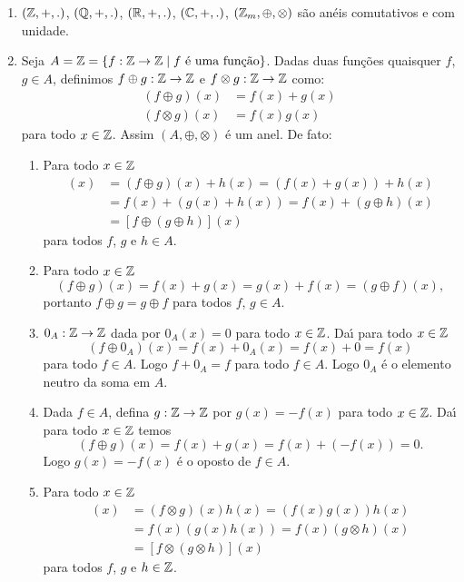 \begin{exemplos}
	\begin{enumerate}[label={\arabic*})]
		\item $(\mathbb{Z},+,.)$, $(\mathbb{Q},+,.)$, $(\mathbb{R},+,.)$, $(\mathbb{C},+,.)$, $(\mathbb{Z}_m, \oplus, \otimes)$ s{\~a}o an{\'e}is comutativos e com unidade.

		\item  Seja $A = \z =\{f : \z \to \z \mid f \mbox{ {\'e} uma fun{\c c}{\~a}o}\}$. Dadas duas fun{\c c}{\~o}es quaisquer $f$, $g \in A$, definimos $f\oplus g:\mathbb{Z} \to \mathbb{Z}$ e $f \otimes g:\mathbb{Z} \to \mathbb{Z}$ como:
		\begin{align*}
			(f\oplus g)(x) &= f(x) + g(x)\\
			(f\otimes g)(x) &= f(x)g(x)
		\end{align*}
		para todo $x \in \mathbb{Z}$. Assim $(A, \oplus, \otimes)$ \'e um anel. De fato:
		\begin{enumerate}[label={\roman*})]
			\item Para todo $x \in \mathbb{Z}$
			\begin{align*}
				[(f \oplus g) \oplus h](x) &= (f \oplus g)(x) + h(x) = (f(x) + g(x)) + h(x)\\
				&= f(x) + (g(x) + h(x)) = f(x) + (g \oplus h)(x)\\ &= [f \oplus (g \oplus h)](x)
			\end{align*}
			para todos $f$, $g$ e $h \in A$.

			\item Para todo $x \in \mathbb{Z}$
			\[
				(f\oplus g)(x) = f(x) + g(x) = g(x) + f(x) = (g\oplus f)(x),
			\]
			portanto $f\oplus g = g\oplus f$ para todos $f$, $g \in A$.

			\item $0_A : \mathbb{Z} \to \mathbb{Z}$ dada por $0_A(x) = 0$ para todo $x \in \mathbb{Z}$. Da{\'\i} para todo $x \in \mathbb{Z}$
			\[
				(f \oplus 0_A)(x) = f(x) + 0_A(x) = f(x) + 0 = f(x)
			\]
			para todo $f \in A$. Logo $f + 0_A = f$ para todo $f \in A$. Logo $0_A$ \'e o elemento neutro da soma em $A$.

			\item Dada $f \in A$, defina $g : \mathbb{Z} \to \mathbb{Z}$ por $g(x) = -f(x)$ para todo $x \in \mathbb{Z}$. Da{\'\i} para todo $x \in \mathbb{Z}$ temos
			\[
				(f \oplus g)(x) = f(x) + g(x) = f(x) + (-f(x)) = 0.
			\]
			Logo $g(x) = -f(x)$ \'e o oposto de $f \in A$.

			\item Para todo $x \in \mathbb{Z}$
			\begin{align*}
				[(f \otimes g)\otimes h](x) &= (f \otimes g)(x)h(x) = (f(x)g(x))h(x)\\ &= f(x)(g(x)h(x)) = f(x)(g \otimes h)(x)\\ &= [f\otimes (g \otimes h)](x)
			\end{align*}
			para todos $f$, $g$ e $h \in \mathbb{Z}$.


\end{enumerate}
\end{enumerate}
\end{exemplos}
